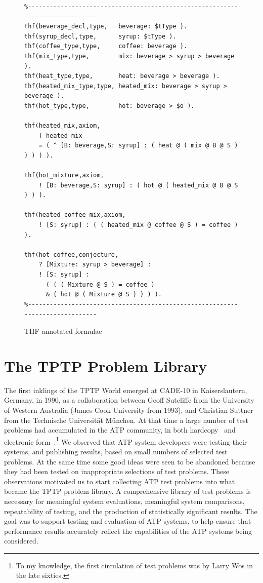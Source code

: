 \documentclass{easychair}
\begin{document}
\begin{figure}[htb]
{\footnotesize
{\setlength{\baselineskip}{3mm}
\begin{verbatim}
%------------------------------------------------------------------------------
thf(beverage_decl,type,   beverage: $tType ).
thf(syrup_decl,type,      syrup: $tType ).
thf(coffee_type,type,     coffee: beverage ).
thf(mix_type,type,        mix: beverage > syrup > beverage ).
thf(heat_type,type,       heat: beverage > beverage ).
thf(heated_mix_type,type, heated_mix: beverage > syrup > beverage ).
thf(hot_type,type,        hot: beverage > $o ).

thf(heated_mix,axiom,
    ( heated_mix
    = ( ^ [B: beverage,S: syrup] : ( heat @ ( mix @ B @ S ) ) ) ) ).

thf(hot_mixture,axiom,
    ! [B: beverage,S: syrup] : ( hot @ ( heated_mix @ B @ S ) ) ).

thf(heated_coffee_mix,axiom,
    ! [S: syrup] : ( ( heated_mix @ coffee @ S ) = coffee ) ).

thf(hot_coffee,conjecture,
    ? [Mixture: syrup > beverage] :
    ! [S: syrup] :
      ( ( ( Mixture @ S ) = coffee )
      & ( hot @ ( Mixture @ S ) ) ) ).
%------------------------------------------------------------------------------
\end{verbatim}
}}
\caption{THF annotated formulae}
\label{ExampleFormulae}
\end{figure}

\section{The TPTP Problem Library}
\label{TPTP}

The first inklings of the TPTP World emerged at CADE-10 in Kaiserslautern, Germany, in 1990, as 
a collaboration between Geoff Sutcliffe from the University of Western Australia (James Cook 
University from 1993), and Christian Suttner from the Technische Universit{\"a}t M{\"u}nchen.
At that time a large number of test problems had accumulated in the ATP community, in both 
hardcopy~\cite{MOW76,WM76,Pel86-JAR,BL+86,Qua92-JAR,MW92-CADE-11} and electronic 
form~\cite{ANL,SPRFN}.\footnote{To my knowledge, the first circulation of test problems was by 
Larry Wos in the late sixties.} 
We observed that ATP system developers were testing their systems, and publishing results, 
based on small numbers of selected test problems.
At the same time some good ideas were seen to be abandoned because they had been tested on
inappropriate selections of test problems.
These observations motivated us to start collecting ATP test problems into what became the TPTP 
problem library.
A comprehensive library of test problems is necessary for meaningful system evaluations, 
meaningful system comparisons, repeatability of testing, and the production of statistically 
significant results. 
The goal was to support testing and evaluation of ATP systems, to help ensure that performance 
results accurately reflect the capabilities of the ATP systems being considered. 
\end{document}
